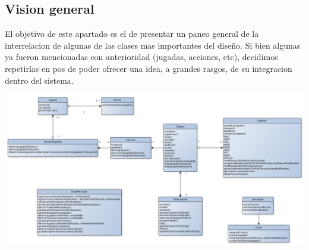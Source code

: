 \subsection{Vision general}
El objetivo de este apartado es el de presentar un paneo general de la interrelacion de algunas de las clases mas importantes del diseño. Si bien algunas ya fueron mencionadas con anterioridad (jugadas, acciones, etc), decidimos repetirlas en pos de poder ofrecer una idea, a grandes rasgos, de su integracion dentro del sistema.

\begin{center}
\includegraphics[scale=0.3]{diagramas/varias_clases.png}
\end{center}